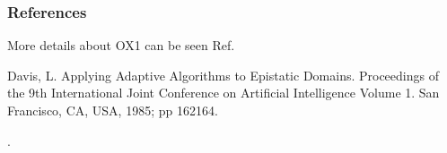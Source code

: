 \documentclass[letterpaper,10pt,english]{sphinxmanual}
\begin{document}
\begin{fulllineitems}
\begin{quote}
\begin{description}
\begin{description}
\end{description}

\end{description}\end{quote}
\subsubsection*{References}

\sphinxAtStartPar
More details about OX1 can be seen Ref. %
\begin{footnote}[3]\sphinxAtStartFootnote
Davis, L. Applying Adaptive Algorithms to Epistatic Domains. Proceedings
of the 9th International Joint Conference on Artificial Intelligence \sphinxhyphen{}
Volume 1. San Francisco, CA, USA, 1985; pp 162\sphinxhyphen{}164.
%
\end{footnote}.

\end{fulllineitems}

\end{document}

